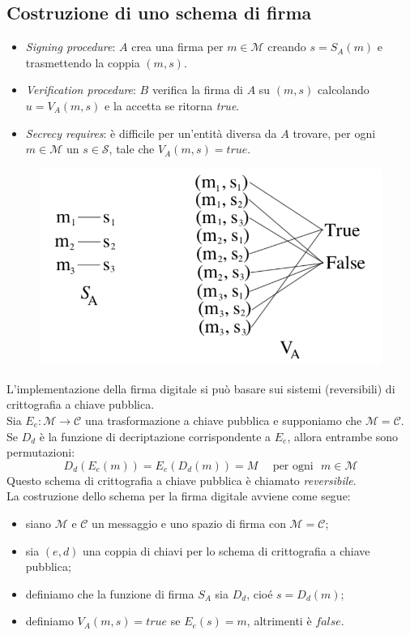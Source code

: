 \documentclass[11pt, a4paper, twoside, italian]{report}
\theoremstyle{plain}
\begin{document}
\subsection*{Costruzione di uno schema di firma}
\begin{multicols}{2}
	\begin{itemize}
		\item \textit{Signing procedure}: $A$ crea una firma per $m\in \mathcal{M}$ creando $s=S_A(m)$ e trasmettendo la coppia $(m,  s)$.
		\item \textit{Verification procedure}: $B$ verifica la firma di $A$ su $(m, s)$ calcolando $u=V_A(m, s)$ e la accetta se ritorna \textit{true}.
		\item \textit{Secrecy requires}: è difficile per un'entità diversa da $A$ trovare, per ogni $m\in \mathcal{M}$ un $s\in \mathcal{S}$, tale che $V_A(m, s) = true$.
	\end{itemize}
\columnbreak
\begin{figure}[H]
	\centering
	\includegraphics[scale=0.6]{signatureschema.png}
\end{figure}
\end{multicols}
\noindent
L'implementazione della firma digitale si può basare sui sistemi (reversibili) di crittografia a chiave pubblica.\\
Sia $E_e: \mathcal{M} \rightarrow \mathcal{C}$ una trasformazione a chiave pubblica e supponiamo che $\mathcal{M} = \mathcal{C}$. Se $D_d$ è la funzione di decriptazione corrispondente a $E_e$, allora entrambe sono permutazioni:
$$ D_d(E_e(m)) = E_e(D_d(m)) = M \text{~~~~per ogni~~} m\in \mathcal{M} $$
\noindent
Questo schema di crittografia a chiave pubblica è chiamato \textit{reversibile}.\\
La costruzione dello schema per la firma digitale avviene come segue:
\begin{itemize}
	\item siano $\mathcal{M}$ e $\mathcal{C}$ un messaggio e uno spazio di firma con $\mathcal{M} = \mathcal{C}$;
	\item sia $(e, d)$ una coppia di chiavi per lo schema di crittografia a chiave pubblica;
	\item definiamo che la funzione di firma $S_A$ sia $D_d$, cioé $s = D_d(m)$;
	\item definiamo $V_A (m, s) = true$ se $E_e(s) = m$, altrimenti è $false$.
\end{itemize}
\end{document}
